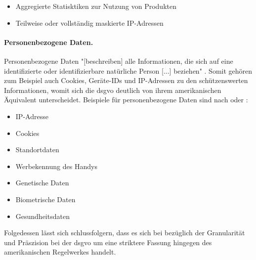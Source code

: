 \begin{itemize}
	\item Aggregierte Statisktiken zur Nutzung von Produkten
	\item Teilweise oder vollständig maskierte IP-Adressen
\end{itemize} 


\paragraph{Personenbezogene Daten.}
\label{sec:Grundlagen:para:Personenbezogene Daten}
Personenbezogene Daten "[beschreiben] alle Informationen, die sich auf eine identifizierte oder identifizierbare natürliche Person [...] beziehen" \cite{DSGVOArt4}. Somit gehören zum Beispiel auch Cookies, Geräte-IDs und IP-Adressen zu den schützenswerten Informationen, womit sich die \ac{dsgvo} deutlich von ihrem amerikanischen Äquivalent unterscheidet. Beispiele für personenbezogene Daten sind nach \cite{PiwikPro2022} oder \cite{DSGVOPerDa}:

\begin{itemize}
	\item IP-Adresse
	\item Cookies
	\item Standortdaten
	\item Werbekennung des Handys
	\item Genetische Daten
	\item Biometrische Daten
	\item Gesundheitsdaten
\end{itemize}

\noindent Folgedessen lässt sich schlussfolgern, dass es sich bei bezüglich der Granularität und Präszision bei der \ac{dsgvo} um eine striktere Fassung hingegen des amerikanischen Regelwerkes handelt.


